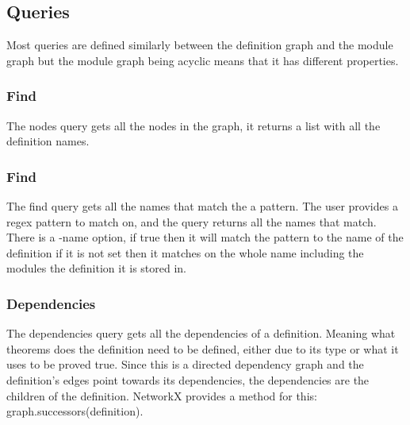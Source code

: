 
\subsection{Queries}

Most queries are defined similarly between the definition graph and the module
graph but the module graph being acyclic means that it has different
properties. 


\subsubsection{Find}

The nodes query gets all the nodes in the graph, it returns a list with all the
definition names.

\subsubsection{Find}

The find query gets all the names that match the a pattern. The user provides a
regex pattern to match on, and the query returns all the names that match.
There is a -name option, if true then it will match the pattern to the name of
the definition if it is not set then it matches on the whole name including the
modules the definition it is stored in.

\subsubsection{Dependencies}

The dependencies query gets all the dependencies of a definition. Meaning what
theorems does the definition need to be defined, either due to its type or what
it uses to be proved true. Since this is a directed dependency graph and the
definition's edges point towards its dependencies, the dependencies are the
children of the definition. NetworkX provides a method for this:
\textsf{graph.successors(definition)}.

